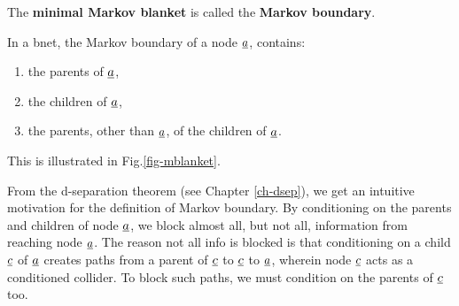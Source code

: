 The {\bf minimal Markov blanket} 
is called the {\bf Markov boundary}.

In a bnet, the Markov boundary
of a node ${\underline{a}}$,
contains:
\begin{enumerate}
\item
the parents of ${\underline{a}}$,
\item
the children of ${\underline{a}}$,
\item
the parents, other than ${\underline{a}}$,
of the children of ${\underline{a}}$.
\end{enumerate}
This is illustrated in 
Fig.\ref{fig-mblanket}.

From the d-separation theorem 
(see Chapter \ref{ch-dsep}),
we get an intuitive motivation 
for the
definition of Markov
boundary.
By conditioning 
on the parents and children
of node ${\underline{a}}$,
we block almost  all,
but not all, information 
from reaching node ${\underline{a}}$.
The reason not all 
info is blocked is that
conditioning on a child ${\underline{c}}$
of ${\underline{a}}$ creates 
paths from
a parent of ${\underline{c}}$ to
${\underline{c}}$ to ${\underline{a}}$, 
wherein node ${\underline{c}}$
acts as a conditioned 
collider. To block such paths,
we must 
condition on the 
parents of ${\underline{c}}$ too.